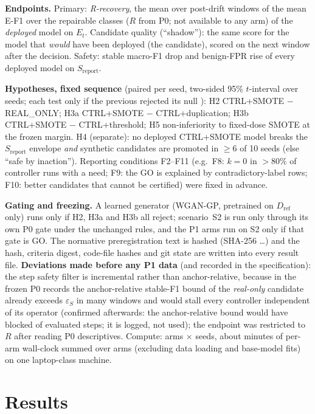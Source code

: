 \documentclass[conference]{IEEEtran}
\newcommand{\Rrec}{R\mbox{-}recovery}
\newcommand{\eps}{\varepsilon}
\begin{document}
\textbf{Endpoints.} Primary: \emph{\Rrec}, the mean over post-drift windows of the mean E-F1 over the repairable classes ($R$ from P0; not available to any arm) of the \emph{deployed} model on $E_t$. Candidate quality (``shadow''): the same score for the model that \emph{would} have been deployed (the candidate), scored on the next window after the decision. Safety: stable macro-F1 drop and benign-FPR rise of every deployed model on $S_{\mathrm{report}}$.

\textbf{Hypotheses, fixed sequence} (paired per seed, two-sided 95\% $t$-interval over seeds; each test only if the previous rejected its null \cite{marcus1976}): H2 CTRL+SMOTE $-$ REAL\_ONLY; H3a CTRL+SMOTE $-$ CTRL+duplication; H3b CTRL+SMOTE $-$ CTRL+threshold; H5 non-inferiority to fixed-dose SMOTE at the frozen margin. H4 (separate): no deployed CTRL+SMOTE model breaks the $S_{\mathrm{report}}$ envelope \emph{and} synthetic candidates are promoted in $\ge6$ of 10 seeds (else ``safe by inaction''). Reporting conditions F2--F11 (e.g.\ F8: $k{=}0$ in $>80\%$ of controller runs with a need; F9: the GO is explained by contradictory-label rows; F10: better candidates that cannot be certified) were fixed in advance.

\textbf{Gating and freezing.} A learned generator (WGAN-GP, pretrained on $D_{\mathrm{ref}}$ only) runs only if H2, H3a and H3b all reject; scenario~S2 is run only through its own P0 gate under the unchanged rules, and the P1 arms run on S2 only if that gate is GO. The normative preregistration text is hashed (SHA-256 \ldots) and the hash, criteria digest, code-file hashes and git state are written into every result file. \textbf{Deviations made before any P1 data} (and recorded in the specification): the step safety filter is incremental rather than anchor-relative, because in the frozen P0 records the anchor-relative stable-F1 bound of the \emph{real-only} candidate already exceeds $\eps_S$ in many windows and would stall every controller independent of its operator (confirmed afterwards: the anchor-relative bound would have blocked \StepAnchorWouldBlockStable{} of \StepCandidates{} evaluated steps; it is logged, not used); the endpoint was restricted to $R$ after reading P0 descriptives. Compute: \nArms{} arms $\times$ \nSeeds{} seeds, about \totalWallMin{} minutes of per-arm wall-clock summed over arms (excluding data loading and base-model fits) on one laptop-class machine.

\section{Results}\label{sec:results}
\end{document}
